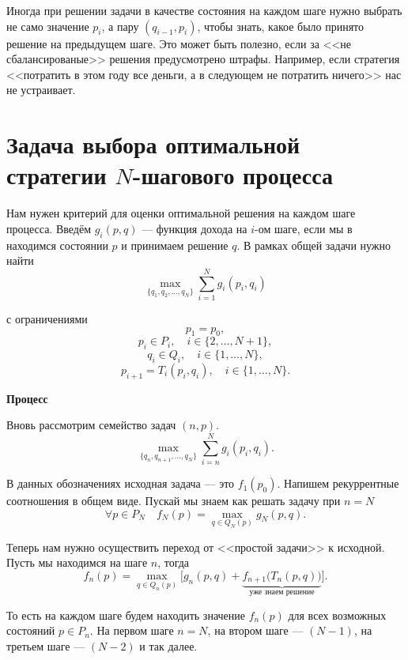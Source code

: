 \remark

Иногда при решении задачи в качестве состояния на каждом шаге нужно выбрать не само значение $p_i$, а пару $(q_{i-1}, p_i)$, чтобы знать, какое было принято решение на предыдущем шаге. Это может быть полезно, если за <<не сбалансированые>> решения предусмотрено штрафы. Например, если стратегия <<потратить в этом году все деньги, а в следующем не потратить ничего>> нас не устраивает.

\section{Задача выбора оптимальной стратегии $N$-шагового процесса}

Нам нужен критерий для оценки оптимальной решения на каждом шаге процесса. Введём $g_i(p, q)$ --- функция дохода на $i$-ом шаге, если мы в находимся состоянии $p$ и принимаем решение $q$. В рамках общей задачи нужно найти
\[
\max_{\{q_1, q_2, \dots, q_N\}} \sum_{i=1}^{N} g_i(p_i, q_i)
\]

с ограничениями
\[
p_1 = p_0,
\]
\[
p_i \in P_i, \quad i \in \{2, \dots, N+1\},
\]
\[
q_i \in Q_i, \quad i \in \{1, \dots, N\},
\]
\[
p_{i+1} = T_i(p_i, q_i), \quad i \in \{1, \dots, N\}.
\]

\bigskip

\textbf{Процесс}

Вновь рассмотрим семейство задач $(n, p)$.
\[
\max_{\{q_n, q_{n+1}, \dots, q_N\}} \sum_{i=n}^{N} g_i(p_i, q_i).
\]

В данных обозначениях исходная задача --- это $f_1(p_0)$. Напишем рекуррентные соотношения в общем виде. Пускай мы знаем как решать задачу при $n = N$
\[
\forall p \in P_{N} \quad f_N(p) = \max_{q \in Q_{N}(p)} g_N(p, q).
\]

Теперь нам нужно осуществить переход от <<простой задачи>> к исходной. Пусть мы находимся на шаге $n$, тогда
\[
f_n(p) = \max_{q \in Q_{n}(p)} \Big[g_n(p, q) + \underbrace{f_{n+1}\big(T_{n}(p, q)\big)}_{\text{уже знаем решение}}\Big].
\]

То есть на каждом шаге будем находить значение $f_n(p)$ для всех возможных состояний $p \in P_n$. На первом шаге $n = N$, на втором шаге --- $(N-1)$, на третьем шаге --- $(N-2)$ и так далее.


